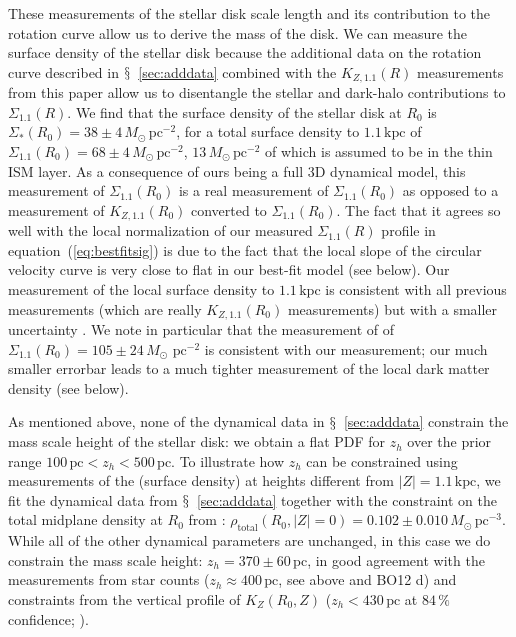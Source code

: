 \documentclass{emulateapj}
\newcommand{\eqnname}{equation}
\newcommand{\equationname}{\eqnname}
\newcommand{\sectionname}{$\mathsection$}
\newcommand{\kpc}{\ensuremath{\,\mathrm{kpc}}}
\newcommand{\pc}{\ensuremath{\,\mathrm{pc}}}
\newcommand{\sigoneone}{\ensuremath{\Sigma_{1.1}}}
\newcommand{\kzoneone}{\ensuremath{K_{Z,1.1}}}
\newcommand{\bo}{BO12}
\begin{document}
These measurements of the stellar disk scale length and its
contribution to the rotation curve allow us to derive the mass of the
disk. We can measure the surface density of the stellar disk because
the additional data on the rotation curve described in
\sectionname~\ref{sec:adddata} combined with the $\kzoneone(R)$
measurements from this paper allow us to disentangle the stellar and
dark-halo contributions to $\sigoneone(R)$. We find that the surface
density of the stellar disk at $R_0$ is $\Sigma_{*}(R_0) =
38\pm4\,M_\odot\pc^{-2}$, for a total surface density to $1.1\kpc$ of
$\sigoneone(R_0) = 68\pm4\,M_\odot\pc^{-2}$, $13\,M_\odot\pc^{-2}$ of
which is assumed to be in the thin ISM layer. As a consequence of ours
being a full 3D dynamical model, this measurement of $\sigoneone(R_0)$
is a real measurement of $\sigoneone(R_0)$ as opposed to a measurement
of $\kzoneone(R_0)$ converted to $\sigoneone(R_0)$. The fact that it
agrees so well with the local normalization of our measured
$\sigoneone(R)$ profile in \equationname~(\ref{eq:bestfitsig}) is due
to the fact that the local slope of the circular velocity curve is
very close to flat in our best-fit model (see below). Our measurement
of the local surface density to $1.1\kpc$ is consistent with all
previous measurements (which are really $\kzoneone(R_0)$ measurements)
but with a smaller uncertainty
\citep{Kuijken89b,Siebert03a,Holmberg04a,Bienayme06a,Garbari12a,Zhang13a}. We
note in particular that the measurement of \citet{Garbari12a} of
$\sigoneone(R_0) = 105\pm24\,M_\odot\,\pc^{-2}$ is consistent with our
measurement; our much smaller errorbar leads to a much tighter
measurement of the local dark matter density (see below).

As mentioned above, none of the dynamical data in
\sectionname~\ref{sec:adddata} constrain the mass scale height of the
stellar disk: we obtain a flat PDF for $z_h$ over the prior range
$100\pc < z_h < 500\pc$. To illustrate how $z_h$ can be constrained
using measurements of the (surface density) at heights different from
$|Z| = 1.1\kpc$, we fit the dynamical data from
\sectionname~\ref{sec:adddata} together with the constraint on the
total midplane density at $R_0$ from \citet{Holmberg00a}:
$\rho_{\mathrm{total}}(R_0,|Z| = 0) =
0.102\pm0.010\,M_\odot\pc^{-3}$. While all of the other dynamical
parameters are unchanged, in this case we do constrain the mass scale
height: $z_h = 370\pm60\pc$, in good agreement with the
measurements from star counts ($z_h \approx 400\pc$, see above and \bo
d) and constraints from the vertical profile of $K_Z(R_0,Z)$ ($z_h <
430\pc$ at $84\,\%$ confidence; \citealt{Zhang13a}).
\end{document}
